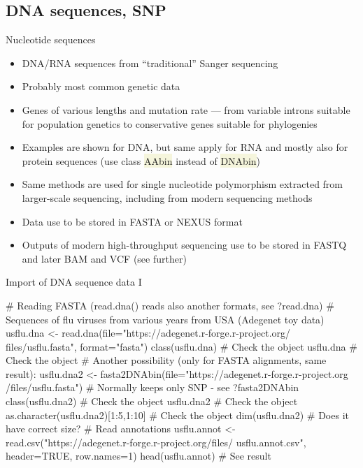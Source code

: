 \documentclass[compress, ucs, xelatex, 11pt, xcolor=svgnames, aspectratio=169,
	hyperref={
		bookmarks=true,
		unicode=true,
		colorlinks=true,
		pdftitle={Molecular data in R},
		plainpages=false,
		pdfauthor={Vojtech Zeisek},
		pdfsubject={Course about phylogeny and evolution in R},
		pdfcreator={XeLaTeX},
		pdfkeywords={R, evolution, phylogeny, molecular data},
		linkcolor=Crimson, %
		anchorcolor=Magenta, %
		citecolor=Magenta, %
		filecolor=Magenta, %
		menucolor=Magenta, %
		urlcolor=DodgerBlue, %
		pdftex},
	url={hyphens, lowtilde} %
	]{beamer}
\renewcommand{\texttt}[1]{\colorbox{Beige}{{\ttfamily #1}}}
\begin{document}
\subsection{DNA sequences, SNP}

\begin{frame}{Nucleotide sequences}
	\begin{itemize}
		\item DNA/RNA sequences from \enquote{traditional} Sanger sequencing
		\item Probably most common genetic data
		\item Genes of various lengths and mutation rate --- from variable introns suitable for population genetics to conservative genes suitable for phylogenies
		\item Examples are shown for DNA, but same apply for RNA and mostly also for protein sequences (use class \texttt{AAbin} instead of \texttt{DNAbin})
		\item Same methods are used for single nucleotide polymorphism extracted from larger-scale sequencing, including from modern sequencing methods
		\item Data use to be stored in FASTA  or NEXUS format
		\item Outputs of modern high-throughput sequencing use to be stored in FASTQ and later BAM and VCF (see further)
	\end{itemize}
\end{frame}

\begin{frame}[fragile]{Import of DNA sequence data I}
	\begin{spluscode}
    # Reading FASTA (read.dna() reads also another formats, see ?read.dna)
    # Sequences of flu viruses from various years from USA (Adegenet toy data)
    usflu.dna <- read.dna(file="https://adegenet.r-forge.r-project.org/
      files/usflu.fasta", format="fasta")
    class(usflu.dna) # Check the object
    usflu.dna # Check the object
    # Another possibility (only for FASTA alignments, same result):
    usflu.dna2 <- fasta2DNAbin(file="https://adegenet.r-forge.r-project.org
      /files/usflu.fasta") # Normally keeps only SNP - see ?fasta2DNAbin
    class(usflu.dna2) # Check the object
    usflu.dna2 # Check the object
    as.character(usflu.dna2)[1:5,1:10] # Check the object
    dim(usflu.dna2) # Does it have correct size?
    # Read annotations
    usflu.annot <- read.csv("https://adegenet.r-forge.r-project.org/files/
      usflu.annot.csv", header=TRUE, row.names=1)
    head(usflu.annot) # See result
	\end{spluscode}
\end{frame}
\end{document}

